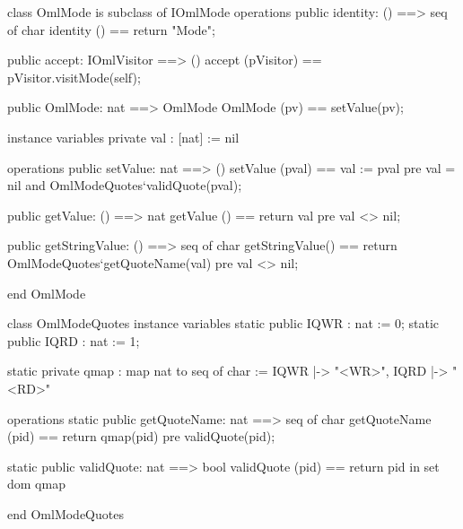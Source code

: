 \begin{vdm_al}
class OmlMode is subclass of IOmlMode
operations
  public identity: () ==> seq of char
  identity () == return "Mode";

  public accept: IOmlVisitor ==> ()
  accept (pVisitor) == pVisitor.visitMode(self);

  public OmlMode: nat ==> OmlMode
  OmlMode (pv) == setValue(pv);

instance variables
  private val : [nat] := nil

operations
  public setValue: nat ==> ()
  setValue (pval) == val := pval
    pre val = nil and OmlModeQuotes`validQuote(pval);

  public getValue: () ==> nat
  getValue () == return val
    pre val <> nil;

  public getStringValue: () ==> seq of char
  getStringValue() == return OmlModeQuotes`getQuoteName(val)
    pre val <> nil;

end OmlMode
\end{vdm_al}
\begin{vdm_al}
class OmlModeQuotes
instance variables
  static public IQWR : nat := 0;
  static public IQRD : nat := 1;

  static private qmap : map nat to seq of char :=
    { IQWR |-> "<WR>",
      IQRD |-> "<RD>" }

operations
  static public getQuoteName: nat ==> seq of char
  getQuoteName (pid) ==
    return qmap(pid)
    pre validQuote(pid);

  static public validQuote: nat ==> bool
  validQuote (pid) == return pid in set dom qmap

end OmlModeQuotes
\end{vdm_al}
